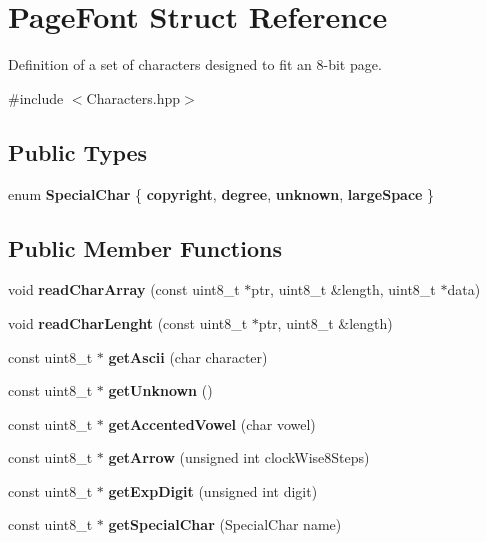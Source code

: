 \section{Page\+Font Struct Reference}
\label{struct_page_font}


Definition of a set of characters designed to fit an 8-\/bit page.  




{\ttfamily \#include $<$Characters.\+hpp$>$}

\subsection*{Public Types}
\begin{DoxyCompactItemize}
\item 
\mbox{\label{struct_page_font_a29c695e276ed9d83bca9e53b0eefc45e}} 
enum {\bfseries Special\+Char} \{ {\bfseries copyright}, 
{\bfseries degree}, 
{\bfseries unknown}, 
{\bfseries large\+Space}
 \}
\end{DoxyCompactItemize}
\subsection*{Public Member Functions}
\begin{DoxyCompactItemize}
\item 
\mbox{\label{struct_page_font_a1807e0c9c7beb63a3159182b00a6be4c}} 
void {\bfseries read\+Char\+Array} (const uint8\+\_\+t $\ast$ptr, uint8\+\_\+t \&length, uint8\+\_\+t $\ast$data)
\item 
\mbox{\label{struct_page_font_a48d06dcdee4b25dee5d08e0829268ca7}} 
void {\bfseries read\+Char\+Lenght} (const uint8\+\_\+t $\ast$ptr, uint8\+\_\+t \&length)
\item 
\mbox{\label{struct_page_font_a4894ed6be3d32d363be6a9d277c3d611}} 
const uint8\+\_\+t $\ast$ {\bfseries get\+Ascii} (char character)
\item 
\mbox{\label{struct_page_font_a2a1dee12a41e8f7428f0c7d249619818}} 
const uint8\+\_\+t $\ast$ {\bfseries get\+Unknown} ()
\item 
\mbox{\label{struct_page_font_a9c753e2368b5ea7ba3c58c10b26f8648}} 
const uint8\+\_\+t $\ast$ {\bfseries get\+Accented\+Vowel} (char vowel)
\item 
\mbox{\label{struct_page_font_acdf3d8dcc712d362b9f503b52cee5719}} 
const uint8\+\_\+t $\ast$ {\bfseries get\+Arrow} (unsigned int clock\+Wise8\+Steps)
\item 
\mbox{\label{struct_page_font_a6913e7a4a77ea6851fee6edee001cd67}} 
const uint8\+\_\+t $\ast$ {\bfseries get\+Exp\+Digit} (unsigned int digit)
\item 
\mbox{\label{struct_page_font_a795a83aba40e91cecd3ec0e3b32d0512}} 
const uint8\+\_\+t $\ast$ {\bfseries get\+Special\+Char} (Special\+Char name)
\end{DoxyCompactItemize}
